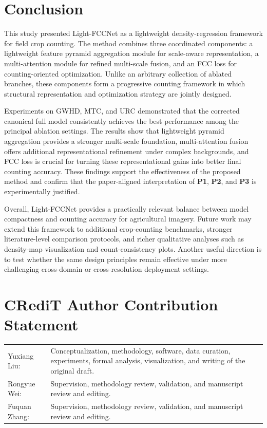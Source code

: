 \documentclass[a4paper,fleqn]{cas-sc}
\begin{document}
\section{Conclusion}

This study presented Light-FCCNet as a lightweight density-regression framework for field crop counting. The method combines three coordinated components: a lightweight feature pyramid aggregation module for scale-aware representation, a multi-attention module for refined multi-scale fusion, and an FCC loss for counting-oriented optimization. Unlike an arbitrary collection of ablated branches, these components form a progressive counting framework in which structural representation and optimization strategy are jointly designed.

Experiments on GWHD, MTC, and URC demonstrated that the corrected canonical full model consistently achieves the best performance among the principal ablation settings. The results show that lightweight pyramid aggregation provides a stronger multi-scale foundation, multi-attention fusion offers additional representational refinement under complex backgrounds, and FCC loss is crucial for turning these representational gains into better final counting accuracy. These findings support the effectiveness of the proposed method and confirm that the paper-aligned interpretation of \textbf{P1}, \textbf{P2}, and \textbf{P3} is experimentally justified.

Overall, Light-FCCNet provides a practically relevant balance between model compactness and counting accuracy for agricultural imagery. Future work may extend this framework to additional crop-counting benchmarks, stronger literature-level comparison protocols, and richer qualitative analyses such as density-map visualization and count-consistency plots. Another useful direction is to test whether the same design principles remain effective under more challenging cross-domain or cross-resolution deployment settings.

\section*{CRediT Author Contribution Statement}
\noindent
\begin{tabularx}{\linewidth}{@{}p{3cm}X@{}}
    Yuxiang Liu: & Conceptualization, methodology, software, data curation, experiments, formal analysis, visualization, and writing of the original draft. \\
    Rongyue Wei: & Supervision, methodology review, validation, and manuscript review and editing. \\
    Fuquan Zhang: & Supervision, methodology review, validation, and manuscript review and editing. \\
\end{tabularx}
\end{document}
